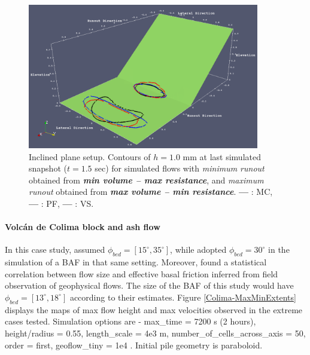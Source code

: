 \documentclass{article}
\begin{document}
\begin{figure}[H]
	\centering
    \includegraphics[width=0.9\textwidth]{Figures/MaxMinRunout.png}
    \caption{Inclined plane setup. Contours of $h = 1.0$ mm at last simulated snapshot ($t = 1.5$ sec) for simulated flows with \emph{minimum runout} obtained from \emph{\textbf{min volume -- max resistance}}, and \emph{maximum runout} obtained from \emph{\textbf{max volume -- min resistance}}. {\color{red} \textbf{---}} : MC, {\color{blue} \textbf{---}} : PF, \textbf{---} : VS.}\label{fig:Ramp-MaxMinRunouts}
\end{figure}

\newpage
\paragraph{Volc{\'a}n de Colima block and ash flow}
In this case study, \cite{Dalbey2008} assumed $\phi_{bed}=[15^\mathrm{\circ}, 35^\mathrm{\circ}]$, while \citep{Capra2011} adopted $\phi_{bed}=30^\mathrm{\circ}$ in the simulation of a BAF in that same setting. Moreover, \cite{Spiller2014,Bayarri2015,Ogburn2016} found a statistical correlation between flow size and effective basal friction inferred from field observation of geophysical flows. The size of the BAF of this study would have $\phi_{bed}=[13^\mathrm{\circ}, 18^\mathrm{\circ}]$ according to their estimates. Figure \ref{Colima-MaxMinExtents} displays the maps of max flow height and max velocities observed in the extreme cases tested. Simulation options are - max\_time = 7200 s (2 hours), height/radius = 0.55, length\_scale = 4e3 m, number\_of\_cells\_across\_axis = 50, order = first, geoflow\_tiny = 1e4 \citep{Patra2005,Aghakhani2016}. Initial pile geometry is paraboloid.
\end{document}
